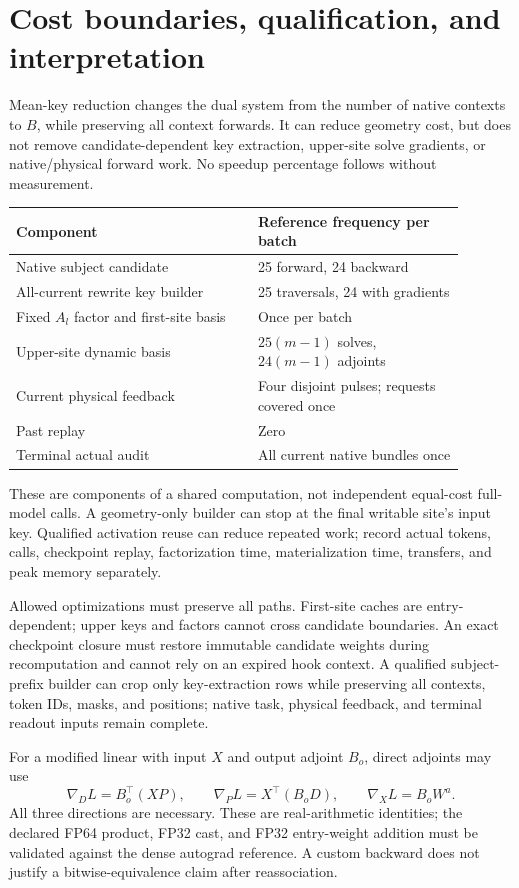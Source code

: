\documentclass[10pt]{article}
\begin{document}
\newpage
\section{Cost boundaries, qualification, and interpretation}
Mean-key reduction changes the dual system from the number of native
contexts to $B$, while preserving all context forwards. It can reduce
geometry cost, but does not remove candidate-dependent key extraction,
upper-site solve gradients, or native/physical forward work. No speedup
percentage follows without measurement.

\begin{center}
\begin{tabular}{p{0.48\linewidth}p{0.41\linewidth}}
\toprule
Component & Reference frequency per batch\\
\midrule
Native subject candidate & 25 forward, 24 backward\\
All-current rewrite key builder & 25 traversals, 24 with gradients\\
Fixed $A_l$ factor and first-site basis & Once per batch\\
Upper-site dynamic basis & $25(m-1)$ solves, $24(m-1)$ adjoints\\
Current physical feedback & Four disjoint pulses; requests covered once\\
Past replay & Zero\\
Terminal actual audit & All current native bundles once\\
\bottomrule
\end{tabular}
\end{center}
These are components of a shared computation, not independent equal-cost
full-model calls. A geometry-only builder can stop at the final writable
site's input key. Qualified activation reuse can reduce repeated work;
record actual tokens, calls, checkpoint replay, factorization time,
materialization time, transfers, and peak memory separately.

Allowed optimizations must preserve all paths. First-site caches are
entry-dependent; upper keys and factors cannot cross candidate boundaries.
An exact checkpoint closure must restore immutable candidate weights
during recomputation and cannot rely on an expired hook context. A
qualified subject-prefix builder can crop only key-extraction rows while
preserving all contexts, token IDs, masks, and positions; native task,
physical feedback, and terminal readout inputs remain complete.

For a modified linear with input $X$ and output adjoint $B_o$, direct
adjoints may use
\[
 \nabla_D L=B_o^\top(XP),\qquad
 \nabla_P L=X^\top(B_oD),\qquad
 \nabla_X L=B_oW^a.
\]
All three directions are necessary. These are real-arithmetic identities;
the declared FP64 product, FP32 cast, and FP32 entry-weight addition must
be validated against the dense autograd reference. A custom backward
does not justify a bitwise-equivalence claim after reassociation.
\end{document}
